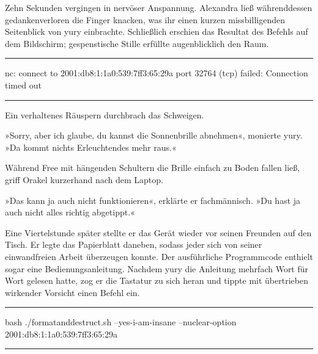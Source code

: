 Zehn Sekunden vergingen in nervöser Anspannung. Alexandra ließ währenddessen gedankenverloren die Finger knacken, was ihr einen kurzen missbilligenden Seitenblick von yury einbrachte. Schließlich erschien das Resultat des Befehls auf dem Bildschirm; gespenstische Stille erfüllte augenblicklich den Raum.

\noindent \parbox{\textwidth}{ \vspace{3ex} \hrule \vspace{3ex}

    \begin{tiny}
    \begin{ttfamily}

\noindent nc: connect to 2001:db8:1:1a0:539:7ff3:65:29a port 32764 (tcp) failed: Connection timed out

    \end{ttfamily}
    \end{tiny}

\vspace{3ex} \hrule \vspace{3ex} }

Ein verhaltenes Räuspern durchbrach das Schweigen.

»Sorry, aber ich glaube, du kannst die Sonnenbrille abnehmen«, monierte yury. »Da kommt nichts Erleuchtendes mehr raus.«

Während Free mit hängenden Schultern die Brille einfach zu Boden fallen ließ, griff Orakel kurzerhand nach dem Laptop.

»Das kann ja auch nicht funktionieren«, erklärte er fachmännisch. »Du hast ja auch nicht alles richtig abgetippt.«

Eine Viertelstunde später stellte er das Gerät wieder vor seinen Freunden auf den Tisch. Er legte das Papierblatt daneben, sodass jeder sich von seiner einwandfreien Arbeit überzeugen konnte. Der ausführliche Programmcode enthielt sogar eine Bedienungsanleitung. Nachdem yury die Anleitung mehrfach Wort für Wort gelesen hatte, zog er die Tastatur zu sich heran und tippte mit übertrieben wirkender Vorsicht einen Befehl ein.

\noindent \parbox{\textwidth}{ \vspace{3ex} \hrule \vspace{3ex}

    \begin{tiny}
    \begin{ttfamily}

\noindent bash ./formatanddestruct.sh --yes-i-am-insane --nuclear-option 2001:db8:1:1a0:539:7ff3:65:29a

    \end{ttfamily}
    \end{tiny}

\vspace{3ex} \hrule \vspace{3ex} }


